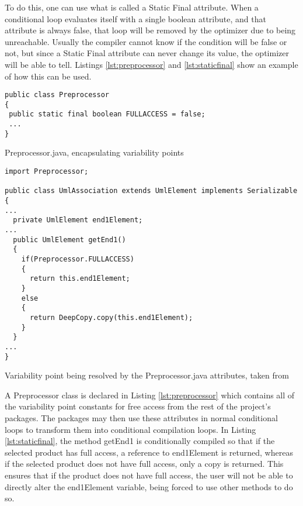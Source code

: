 To do this, one can use what is called a Static Final attribute. When a conditional loop evaluates itself with a single boolean attribute, and that attribute is always false, that loop will be removed by the optimizer due to being unreachable. Usually the compiler cannot know if the condition will be false or not, but since a Static Final attribute can never change its value, the optimizer will be able to tell. Listings \ref{lst:preprocessor} and \ref{lst:staticfinal} show an example of how this can be used.

\begin{listing}
\begin{verbatim}
public class Preprocessor
{
 public static final boolean FULLACCESS = false;
 ...
}
\end{verbatim}
\caption{Preprocessor.java, encapsulating variability points} \label{lst:preprocessor}
\end{listing}

\begin{listing}
\begin{verbatim}
import Preprocessor;

public class UmlAssociation extends UmlElement implements Serializable
{
...
  private UmlElement end1Element;
...
  public UmlElement getEnd1()
  {
    if(Preprocessor.FULLACCESS)
    {
      return this.end1Element;
    }
    else
    {
      return DeepCopy.copy(this.end1Element);
    }
  }
...
}
\end{verbatim}
\caption{Variability point being resolved by the Preprocessor.java attributes, taken from \cite{AUTOREST}} \label{lst:staticfinal}
\end{listing}

A Preprocessor class is declared in Listing \ref{lst:preprocessor} which contains all of the variability point constants for free access from the rest of the project's packages. The packages may then use these attributes in normal conditional loops to transform them into conditional compilation loops. In Listing \ref{lst:staticfinal}, the method getEnd1 is conditionally compiled so that if the selected product has full access, a reference to end1Element is returned, whereas if the selected product does not have full access, only a copy is returned. This ensures that if the product does not have full access, the user will not be able to directly alter the end1Element variable, being forced to use other methods to do so.

